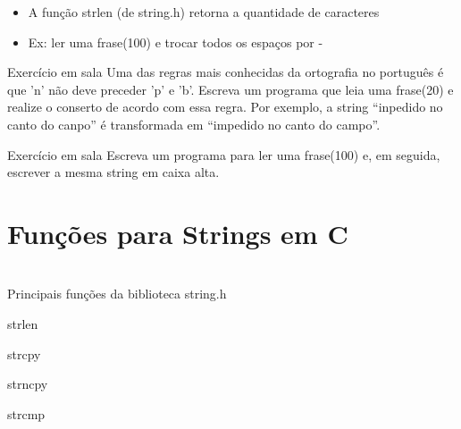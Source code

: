 \documentclass[portuguese,10pt,xcolor=table]{bredelebeamer}
\begin{document}
		\begin{frame}{\insertsection} 
			\begin{itemize}
				\item A função strlen (de string.h) retorna a quantidade de caracteres
				\item Ex: ler uma frase(100) e trocar todos os espaços por -
					
			\end{itemize}
		\end{frame}



		\begin{frame}
			\begin{alertblock}{ Exercício em sala}
				Uma das regras mais conhecidas da ortografia no português é que 'n' não deve preceder 'p' e 'b'. Escreva um programa que leia uma frase(20) e realize o conserto de acordo com essa regra. Por exemplo, a string ``inpedido no canto do canpo'' é transformada em ``impedido no canto do campo''.
			\end{alertblock}
		\end{frame}


		\begin{frame}
			\begin{alertblock}{ Exercício em sala}
				Escreva um programa para ler uma frase(100) e, em seguida, escrever a mesma string em caixa alta.
			\end{alertblock}
		\end{frame}

	\section{Funções para Strings em C}

		\begin{frame}[c]
			\begin{center}
				\structure{\large \insertsection}
				\\Principais funções da biblioteca string.h
			\end{center}
		\end{frame} 
		
		\begin{frame}[c]
			strlen\\
			
		\end{frame}

		\begin{frame}[c]
			strcpy\\
			
		\end{frame}

		\begin{frame}[c]
			strncpy\\
			
		\end{frame}

		\begin{frame}[c]
			strcmp\\
			
		\end{frame}
\end{document}
